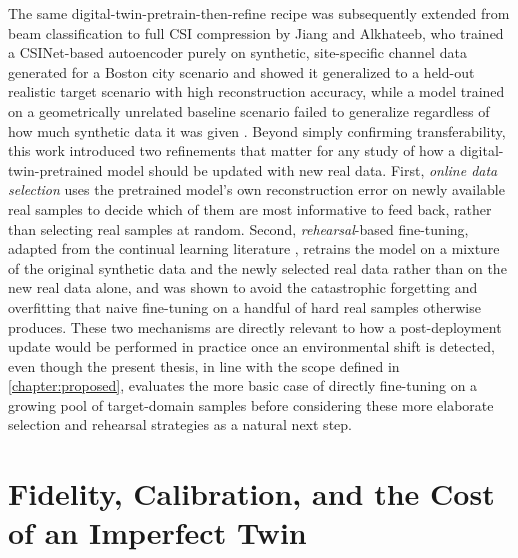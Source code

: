 \documentclass{iutbscthesis}
\begin{document}
The same digital-twin-pretrain-then-refine recipe was subsequently extended from beam classification to full CSI compression by Jiang and Alkhateeb, who trained a CSINet-based autoencoder purely on synthetic, site-specific channel data generated for a Boston city scenario and showed it generalized to a held-out realistic target scenario with high reconstruction accuracy, while a model trained on a geometrically unrelated baseline scenario failed to generalize regardless of how much synthetic data it was given \cite{jiang2024digitaltwincsi}. Beyond simply confirming transferability, this work introduced two refinements that matter for any study of how a digital-twin-pretrained model should be updated with new real data. First, \emph{online data selection} uses the pretrained model's own reconstruction error on newly available real samples to decide which of them are most informative to feed back, rather than selecting real samples at random. Second, \emph{rehearsal}-based fine-tuning, adapted from the continual learning literature \cite{robins1995catastrophic}, retrains the model on a mixture of the original synthetic data and the newly selected real data rather than on the new real data alone, and was shown to avoid the catastrophic forgetting and overfitting that naive fine-tuning on a handful of hard real samples otherwise produces. These two mechanisms are directly relevant to how a post-deployment update would be performed in practice once an environmental shift is detected, even though the present thesis, in line with the scope defined in \autoref{chapter:proposed}, evaluates the more basic case of directly fine-tuning on a growing pool of target-domain samples before considering these more elaborate selection and rehearsal strategies as a natural next step.

\section{Fidelity, Calibration, and the Cost of an Imperfect Twin}
\end{document}
